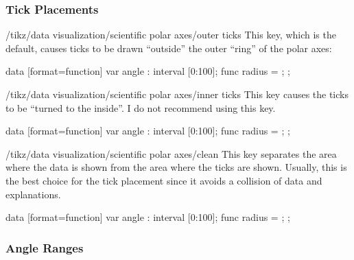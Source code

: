 \subsubsection{Tick Placements}

\begin{key}{/tikz/data visualization/scientific polar axes/outer ticks}
    This key, which is the default, causes ticks to be drawn ``outside'' the
    outer ``ring'' of the polar axes:
\begin{codeexample}[
    width=8.8cm,
    preamble={\usetikzlibrary{datavisualization.formats.functions}},
]
\tikz \datavisualization [
  scientific polar axes={outer ticks, 0 to 180},
  visualize as smooth line]
data [format=function] {
  var  angle : interval [0:100];
  func radius = \value{angle};
};
\end{codeexample}
\end{key}

\begin{key}{/tikz/data visualization/scientific polar axes/inner ticks}
    This key causes the ticks to be ``turned to the inside''. I do not
    recommend using this key.
\begin{codeexample}[
    width=8.8cm,
    preamble={\usetikzlibrary{datavisualization.formats.functions}},
]
\tikz \datavisualization [
  scientific polar axes={inner ticks, 0 to 180},
  visualize as smooth line]
data [format=function] {
  var  angle : interval [0:100];
  func radius = \value{angle};
};
\end{codeexample}
\end{key}

\begin{key}{/tikz/data visualization/scientific polar axes/clean}
    This key separates the area where the data is shown from the area where the
    ticks are shown. Usually, this is the best choice for the tick placement
    since it avoids a collision of data and explanations.
\begin{codeexample}[
    width=8.8cm,
    preamble={\usetikzlibrary{datavisualization.formats.functions}},
]
\tikz \datavisualization [
  scientific polar axes={clean, 0 to 180},
  visualize as smooth line]
data [format=function] {
  var  angle : interval [0:100];
  func radius = \value{angle};
};
\end{codeexample}
\end{key}


\subsubsection{Angle Ranges}
\label{section-dv-angle-ranges}

